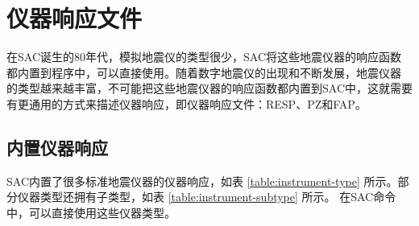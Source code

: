 \section{仪器响应文件}
在SAC诞生的80年代，模拟地震仪的类型很少，SAC将这些地震仪器的响应函数
都内置到程序中，可以直接使用。随着数字地震仪的出现和不断发展，地震仪器
的类型越来越丰富，不可能把这些地震仪器的响应函数都内置到SAC中，这就需要
有更通用的方式来描述仪器响应，即仪器响应文件：RESP、PZ和FAP。

\subsection{内置仪器响应}
SAC内置了很多标准地震仪器的仪器响应，如表 \ref{table:instrument-type}
所示。部分仪器类型还拥有子类型，如表 \ref{table:instrument-subtype} 所示。
在SAC命令中，可以直接使用这些仪器类型。

